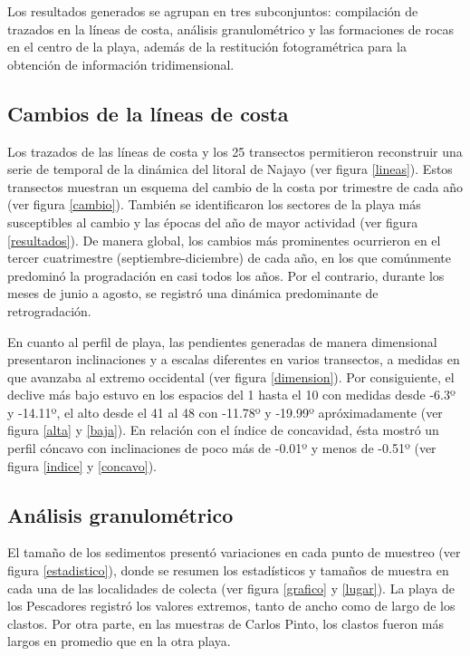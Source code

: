 \documentclass[11pt,]{article}
\begin{document}
Los resultados generados se agrupan en tres subconjuntos: compilación de
trazados en la líneas de costa, análisis granulométrico y las
formaciones de rocas en el centro de la playa, además de la restitución
fotogramétrica para la obtención de información tridimensional.

\subsection{Cambios de la líneas de
costa}\label{cambios-de-la-luxedneas-de-costa}

Los trazados de las líneas de costa y los 25 transectos permitieron
reconstruir una serie de temporal de la dinámica del litoral de Najayo
(ver figura \ref{lineas}). Estos transectos muestran un esquema del
cambio de la costa por trimestre de cada año (ver figura \ref{cambio}).
También se identificaron los sectores de la playa más susceptibles al
cambio y las épocas del año de mayor actividad (ver figura
\ref{resultados}). De manera global, los cambios más prominentes
ocurrieron en el tercer cuatrimestre (septiembre-diciembre) de cada año,
en los que comúnmente predominó la progradación en casi todos los años.
Por el contrario, durante los meses de junio a agosto, se registró una
dinámica predominante de retrogradación.

En cuanto al perfil de playa, las pendientes generadas de manera
dimensional presentaron inclinaciones y a escalas diferentes en varios
transectos, a medidas en que avanzaba al extremo occidental (ver figura
\ref{dimension}). Por consiguiente, el declive más bajo estuvo en los
espacios del 1 hasta el 10 con medidas desde -6.3º y -14.11º, el alto
desde el 41 al 48 con -11.78º y -19.99º apróximadamente (ver figura
\ref{alta} y \ref{baja}). En relación con el índice de concavidad, ésta
mostró un perfil cóncavo con inclinaciones de poco más de -0.01º y menos
de -0.51º (ver figura \ref{indice} y \ref{concavo}).

\subsection{Análisis
granulométrico}\label{anuxe1lisis-granulomuxe9trico}

El tamaño de los sedimentos presentó variaciones en cada punto de
muestreo (ver figura \ref{estadistico}), donde se resumen los
estadísticos y tamaños de muestra en cada una de las localidades de
colecta (ver figura \ref{grafico} y \ref{lugar}). La playa de los
Pescadores registró los valores extremos, tanto de ancho como de largo
de los clastos. Por otra parte, en las muestras de Carlos Pinto, los
clastos fueron más largos en promedio que en la otra playa.
\end{document}
